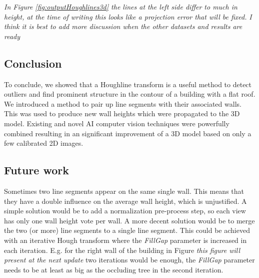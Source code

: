 \emph{In Figure \ref{fig:outputHoughlines3d} the lines at the left side differ to much in
height, at the time of writing this looks like a projection error that will be
fixed.}
\emph{I think it is best to add more discussion when the other datasets and results are ready}



\subsection{Conclusion}
To conclude, we showed that a Houghline transform is a useful method to detect
outliers and find prominent structure in the contour of a building with a flat
roof. We introduced a method to pair up line segments with their associated
walls. This was used to produce new wall heights which were propagated to the 3D
model.  Existing and novel AI computer vision techniques were powerfully
combined resulting in an significant improvement of a 3D model based on only a
few calibrated 2D images. 

\subsection{Future work}
Sometimes two line segments appear on the same single wall. This means that they have a double
influence on the average wall height, which is unjustified. 
A simple solution would be to add a normalization pre-process step, so each view
has only one wall height vote per wall. A more decent solution would be to
merge the two (or more) line segments to a single line segment. This could be
achieved with an iterative Hough transform where the \emph{FillGap} parameter is
increased in each iteration. E.g. for the right wall of the building in Figure
\emph{this figure will present at the next update}  %
two iterations would be enough, the \emph{FillGap} parameter needs to be at
least as big as the occluding tree in the second iteration.\\

